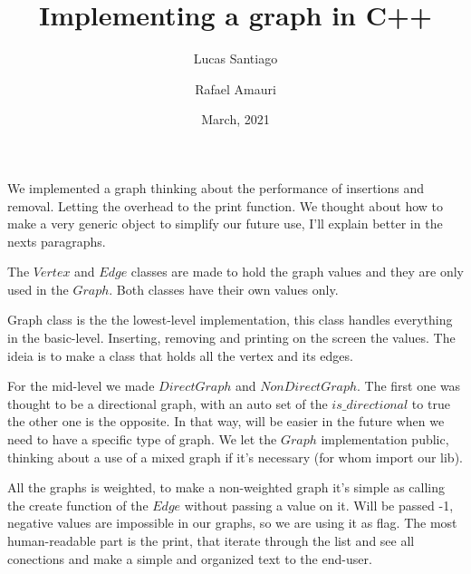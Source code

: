 \documentclass{article}
\title{Implementing a graph in C++}
\author{Lucas Santiago \and Rafael Amauri}
\date{March, 2021}
\begin{document}
\maketitle

We implemented a graph thinking about the performance of insertions and removal.
Letting the overhead to the print function. We thought about how to make a very generic object
to simplify our future use, I'll explain better in the nexts paragraphs.

The $Vertex$ and $Edge$ classes are made to hold the graph values and they are only used in the $Graph$.
Both classes have their own values only.

Graph class is the the lowest-level implementation, this class handles 
everything in the basic-level. Inserting, removing and printing on the screen the values.
The ideia is to make a class that holds all the vertex and its edges.

For the mid-level we made $DirectGraph$ and $NonDirectGraph$. The first one was thought to be a directional
graph, with an auto set of the $is\_directional$ to true the other one is the opposite. In that way,
will be easier in the future when we need to have a specific type of graph. We let the $Graph$ implementation public,
thinking about a use of a mixed graph if it's necessary (for whom import our lib).

All the graphs is weighted, to make a non-weighted graph it's simple as calling the create function of the $Edge$
without passing a value on it. Will be passed -1, negative values are impossible in our graphs, so we are using
it as flag. The most human-readable part is the print, that iterate through the list and see all conections
and make a simple and organized text to the end-user.
\end{document}
